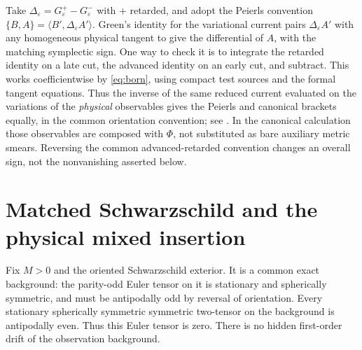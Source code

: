 \documentclass[11pt]{article}
\newcommand{\eps}{\varepsilon}
\begin{document}
Take \(\Delta_\eps=G^+_\eps-G^-_\eps\) with \(+\) retarded, and adopt the Peierls convention \(\{B,A\}=\langle B',\Delta_\eps A'\rangle\). Green's identity for the variational current pairs \(\Delta_\eps A'\) with any homogeneous physical tangent to give the differential of \(A\), with the matching symplectic sign. One way to check it is to integrate the retarded identity on a late cut, the advanced identity on an early cut, and subtract. This works coefficientwise by \eqref{eq:born}, using compact test sources and the formal tangent equations. Thus the inverse of the same reduced current evaluated on the variations of the \emph{physical} observables gives the Peierls and canonical brackets equally, in the common orientation convention; see \cite{Khavkine}. In the canonical calculation those observables are composed with \(\Phi\), not substituted as bare auxiliary metric smears. Reversing the common advanced-retarded convention changes an overall sign, not the nonvanishing asserted below.

\section{Matched Schwarzschild and the physical mixed insertion}

Fix \(M>0\) and the oriented Schwarzschild exterior. It is a common exact background: the parity-odd Euler tensor on it is stationary and spherically symmetric, and must be antipodally odd by reversal of orientation. Every stationary spherically symmetric symmetric two-tensor on the background is antipodally even. Thus this Euler tensor is zero. There is no hidden first-order drift of the observation background.
\end{document}
